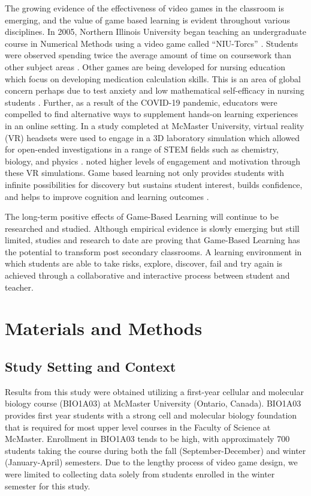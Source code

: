 \documentclass[10pt]{article}
\begin{document}
The growing evidence of the effectiveness of video games in the classroom is emerging, and the value of game based learning is evident throughout various disciplines. In 2005, Northern Illinois University began teaching an undergraduate course in Numerical Methods using a video game called “NIU-Torcs” \citep{coller2009effectiveness}. Students were observed spending twice the average amount of time on coursework than other subject areas \citep{coller2009effectiveness}. Other games are being developed for nursing education which focus on developing medication calculation skills. This is an area of global concern perhaps due to test anxiety and low mathematical self-efficacy in nursing students \citep{foss2013medication}. Further, as a result of the COVID-19 pandemic, educators were compelled to find alternative ways to supplement hands-on learning experiences in an online setting. In a study completed at McMaster University, virtual reality (VR) headsets were used to engage in a 3D laboratory simulation which allowed for open-ended investigations in a range of STEM fields such as chemistry, biology, and physics \citep{tsirulnikov2023game}. \citet{tsirulnikov2023game} noted higher levels of engagement and motivation through these VR simulations. Game based learning not only provides students with infinite possibilities for discovery but sustains student interest, builds confidence, and helps to improve cognition and learning outcomes \citep{divjak2011impact}.

The long-term positive effects of Game-Based Learning will continue to be researched and studied. Although empirical evidence is slowly emerging but still limited, studies and research to date are proving that Game-Based Learning has the potential to transform post secondary classrooms. A learning environment in which students are able to take risks, explore, discover, fail and try again is achieved through a collaborative and interactive process between student and teacher.

\section{Materials and Methods}

\subsection{Study Setting and Context}

Results from this study were obtained utilizing a first-year cellular and molecular biology course (BIO1A03) at McMaster University (Ontario, Canada). BIO1A03 provides first year students with a strong cell and molecular biology foundation that is required for most upper level courses in the Faculty of Science at McMaster. Enrollment in BIO1A03 tends to be high, with approximately 700 students taking the course during both the fall (September-December) and winter (January-April) semesters. Due to the lengthy process of video game design, we were limited to collecting data solely from students enrolled in the winter semester for this study.
\end{document}
